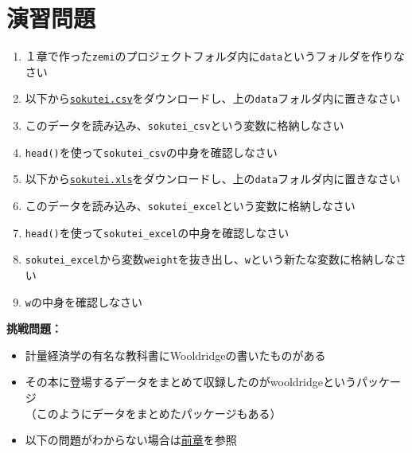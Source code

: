 \documentclass[
]{book}
\providecommand{\tightlist}{%
  \setlength{\itemsep}{0pt}\setlength{\parskip}{0pt}}
\begin{document}
\hypertarget{ux6f14ux7fd2ux554fux984c-3}{%
\section{演習問題}\label{ux6f14ux7fd2ux554fux984c-3}}

\begin{enumerate}
\def\labelenumi{\arabic{enumi}.}
\tightlist
\item
  １章で作った\texttt{zemi}のプロジェクトフォルダ内に\texttt{data}というフォルダを作りなさい\\
\item
  以下から\href{https://www.dropbox.com/s/8fy2dbnurinract/shitaisokutei.csv?dl=0}{\texttt{sokutei.csv}}をダウンロードし、上の\texttt{data}フォルダ内に置きなさい\\
\item
  このデータを読み込み、\texttt{sokutei\_csv}という変数に格納しなさい\\
\item
  \texttt{head()}を使って\texttt{sokutei\_csv}の中身を確認しなさい\\
\item
  以下から\href{https://www.dropbox.com/s/m4m4etyd81pnpq6/sokutei.xls?dl=0}{\texttt{sokutei.xls}}をダウンロードし、上の\texttt{data}フォルダ内に置きなさい\\
\item
  このデータを読み込み、\texttt{sokutei\_excel}という変数に格納しなさい\\
\item
  \texttt{head()}を使って\texttt{sokutei\_excel}の中身を確認しなさい\\
\item
  \texttt{sokutei\_excel}から変数\texttt{weight}を抜き出し、\texttt{w}という新たな変数に格納しなさい\\
\item
  \texttt{w}の中身を確認しなさい\\
\end{enumerate}

\textbf{挑戦問題：}

\begin{itemize}
\tightlist
\item
  計量経済学の有名な教科書にWooldridgeの書いたものがある\\
\item
  その本に登場するデータをまとめて収録したのがwooldridgeというパッケージ\\
  （このようにデータをまとめたパッケージもある）\\
\item
  以下の問題がわからない場合は\protect\hyperlink{ux30d1ux30c3ux30b1ux30fcux30b8}{前章}を参照
\end{itemize}
\end{document}
